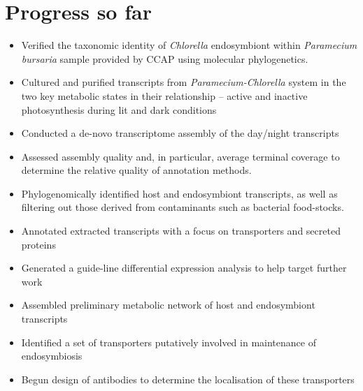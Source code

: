 \documentclass[a4paper,11pt]{article}
\begin{document}
\newpage

\section{Progress so far}
\begin{itemize}
  \item Verified the taxonomic identity of \textit{Chlorella} endosymbiont within \textit{Paramecium bursaria} sample provided by CCAP using molecular phylogenetics.
  \item Cultured and purified transcripts from \textit{Paramecium-Chlorella} system in the two key metabolic states in their relationship – active and inactive photosynthesis during lit and dark conditions
  \item Conducted a de-novo transcriptome assembly of the day/night transcripts
  \item Assessed assembly quality and, in particular, average terminal coverage to determine the relative quality of annotation methods.
  \item Phylogenomically identified host and endosymbiont transcripts, as well as filtering out those derived from contaminants such as bacterial food-stocks.
  \item Annotated extracted transcripts with a focus on transporters and secreted proteins
  \item Generated a guide-line differential expression analysis to help target further work
  \item Assembled preliminary metabolic network of host and endosymbiont transcripts
  \item Identified a set of transporters putatively involved in maintenance of endosymbiosis
  \item Begun design of antibodies to determine the localisation of these transporters
\end{itemize}
\end{document}
